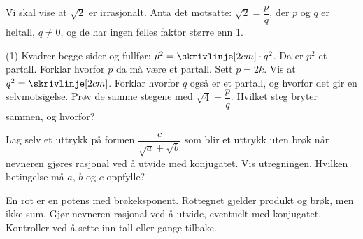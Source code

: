 Vi skal vise at $\sqrt{2}$ er irrasjonalt. Anta det motsatte: $\sqrt{2} = \dfrac{p}{q}$, der $p$ og $q$ er heltall, $q \neq 0$, og de har ingen felles faktor større enn 1.
\begin{tasks}(1)
  \task Kvadrer begge sider og fullfør: $p^2 = \skrivlinje[2cm]\cdot q^2$.
  \task Da er $p^2$ et partall. Forklar hvorfor $p$ da må være et partall.
  \task Sett $p = 2k$. Vis at $q^2 = \skrivlinje[2cm]$.
  \task Forklar hvorfor $q$ også er et partall, og hvorfor det gir en selvmotsigelse.
  \task Prøv de samme stegene med $\sqrt{4} = \dfrac{p}{q}$. Hvilket steg bryter sammen, og hvorfor?
\end{tasks}

Lag selv et uttrykk på formen $\dfrac{c}{\sqrt{a}+\sqrt{b}}$ som blir et uttrykk uten brøk når nevneren gjøres rasjonal ved å utvide med konjugatet. Vis utregningen. Hvilken betingelse må $a$, $b$ og $c$ oppfylle?

\begin{oppsummering}
En rot er en potens med brøkeksponent. Rottegnet gjelder produkt og brøk, men ikke sum.
Gjør nevneren rasjonal ved å utvide, eventuelt med konjugatet.
Kontroller ved å sette inn tall eller gange tilbake.
\end{oppsummering}
